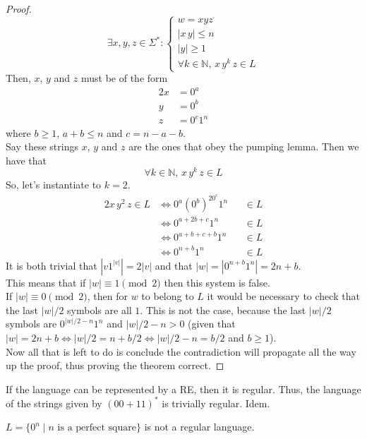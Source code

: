\documentclass[docid=TP07]{tcom_TP}
\begin{document}
{\begin{proof}
\begin{equation*}
\exists x, y, z \in \Sigma^* \colon 
\begin{cases}
	w = xyz \\
	|x\,y| \leq n\\
	|y| \geq 1\\
	\forall k \in \mathbb{N},\,x\,y^k\,z \in L
\end{cases}
\end{equation*}
Then, $x$, $y$ and $z$ must be of the form
\begin{alignat*}{2}
	x &= 0^a\\
	y &= 0^b\\
	z &= 0^c1^{n}
\end{alignat*}
where $b \geq 1$, $a+b \leq n$ and $c=n-a-b$.\\
Say these strings $x$, $y$ and $z$ are the ones that obey the pumping lemma. Then we have that
\begin{equation*}
	\forall k \in \mathbb{N},\,x\,y^k\,z \in L
\end{equation*}
So, let's instantiate to $k=2$.
\begin{alignat*}{2}
	x\,y^2\,z \in L
	& \iff 0^a(0^b)^20^c1^n &&\in L \\
	& \iff 0^{a+2b+c}1^n    &&\in L \\
	& \iff 0^{a+b+c+b}1^n   &&\in L \\
	& \iff 0^{n+b}1^n       &&\in L
\end{alignat*}
It is both trivial that $|v 1^{|v|} | = 2|v|$ and that $|w|=|0^{n+b}1^n|=2n+b$.\\
This means that if $|w| \equiv 1 \pmod{2}$ then this system is false.\\
If $|w| \equiv 0 \pmod{2}$, then for $w$ to belong to $L$ it would be necessary to check that the last $|w|/2$ symbols are all $1$. This is not the case, because the last $|w|/2$ symbols are $0^{|w|/2-n}1^n$ and $|w|/2-n > 0$ (given that $|w|=2n+b \iff |w|/2=n+b/2 \iff |w|/2-n=b/2$ and $b \geq 1$).\\
Now all that is left to do is conclude the contradiction will propagate all the way up the proof, thus proving the theorem correct.
\end{proof}
If the language can be represented by a RE, then it is regular. Thus, the language of the strings given by $(00+11)^*$ is trivially regular.
Idem.
\begin{theorem}
$L=\{0^n\mid n \text{ is a perfect square}\}$ is not a regular language.
\end{theorem}
}
\end{document}
